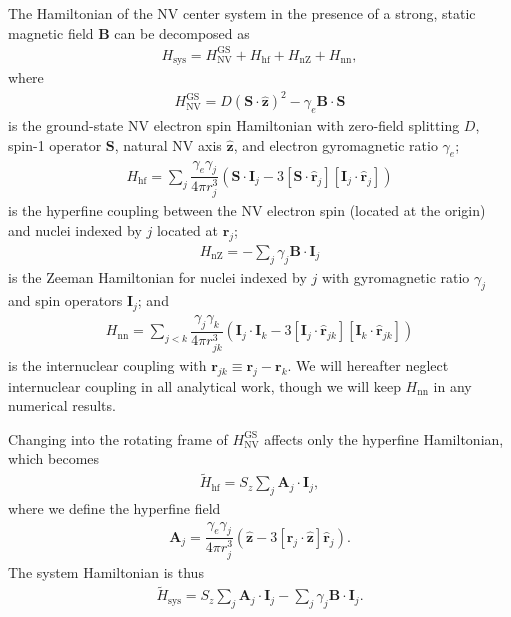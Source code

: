 \documentclass[twocolumn]{revtex4-1}
\renewcommand{\t}{\text} %
\newcommand{\f}[2]{\dfrac{#1}{#2}} %
\newcommand{\p}[1]{\left(#1\right)} %
\renewcommand{\sp}[1]{\left[#1\right]} %
\renewcommand{\v}{\bm} %
\newcommand{\uv}[1]{\hat{\v{#1}}} %
\renewcommand{\c}{\cdot} %
\newcommand{\NV}{\t{NV}}
\begin{document}
The Hamiltonian of the NV center system in the presence of a strong,
static magnetic field $\v B$ can be decomposed as
\begin{align}
  H_\t{sys} = H_\NV^\t{GS} + H_\t{hf} + H_\t{nZ}  + H_\t{nn},
\end{align}
where
\begin{align}
  H_\NV^\t{GS} = D\p{\v S\c\uv z}^2 - \gamma_e\v B\c\v S
\end{align}
is the ground-state NV electron spin Hamiltonian with zero-field
splitting $D$, spin-1 operator $\v S$, natural NV axis $\uv z$, and
electron gyromagnetic ratio $\gamma_e$;
\begin{align}
  H_\t{hf} = \sum_j\f{\gamma_e\gamma_j}{4\pi r_j^3}
  \p{\v S\c\v I_j-3\sp{\v S\c\uv r_j}\sp{\v I_j\c\uv r_j}}
\end{align}
is the hyperfine coupling between the NV electron spin (located at the
origin) and nuclei indexed by $j$ located at $\v r_j$;
\begin{align}
  H_\t{nZ} = -\sum_j\gamma_j\v B\c\v I_j
\end{align}
is the Zeeman Hamiltonian for nuclei indexed by $j$ with gyromagnetic
ratio $\gamma_j$ and spin operators $\v I_j$; and
\begin{align}
  H_\t{nn} = \sum_{j<k}\f{\gamma_j\gamma_k}{4\pi r_{jk}^3}
  \p{\v I_j\c\v I_k-3\sp{\v I_j\c\uv r_{jk}}\sp{\v I_k\c\uv r_{jk}}}
\end{align}
is the internuclear coupling with $\v r_{jk}\equiv\v r_j-\v r_k$. We
will hereafter neglect internuclear coupling in all analytical work,
though we will keep $H_\t{nn}$ in any numerical results.

Changing into the rotating frame of $H_\NV^\t{GS}$ affects only the
hyperfine Hamiltonian, which becomes
\begin{align}
  \tilde H_\t{hf} = S_z\sum_j \v A_j\c\v I_j,
\end{align}
where we define the hyperfine field
\begin{align}
  \v A_j = \f{\gamma_e\gamma_j}{4\pi r_j^3}\p{\uv z - 3\sp{\uv
  r_j\c\uv z}\uv r_j}.
\end{align}
The system Hamiltonian is thus
\begin{align}
  \tilde H_\t{sys} = S_z\sum_j \v A_j\c\v I_j
  -\sum_j\gamma_j\v B\c\v I_j.
\end{align}
\end{document}

